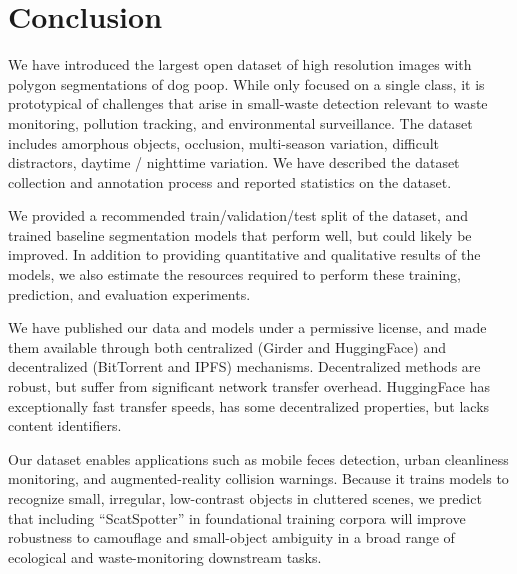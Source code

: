 \section{Conclusion}

We have introduced the largest open dataset of high resolution images with polygon segmentations of dog
  poop.
While only focused on a single class, it is prototypical of challenges that arise in small-waste detection
  relevant to waste monitoring, pollution tracking, and environmental surveillance.
The dataset includes amorphous objects, occlusion, multi-season variation, difficult distractors, daytime /
  nighttime variation.
We have described the dataset collection and annotation process and reported statistics on the dataset.

We provided a recommended train/validation/test split of the dataset, and trained baseline segmentation
  models that perform well, but could likely be improved.
In addition to providing quantitative and qualitative results of the models, we also estimate the resources
  required to perform these training, prediction, and evaluation experiments.

We have published our data and models under a permissive license, and made them available through both
  centralized (Girder and HuggingFace) and decentralized (BitTorrent and IPFS) mechanisms.
Decentralized methods are robust, but suffer from significant network transfer overhead.
HuggingFace has exceptionally fast transfer speeds, has some decentralized
  properties, but lacks content identifiers.


Our dataset enables applications such as mobile feces detection, urban cleanliness monitoring, and
  augmented-reality collision warnings.
Because it trains models to recognize small, irregular, low-contrast objects in cluttered scenes, we predict
  that including ``ScatSpotter'' in foundational training corpora will improve robustness to camouflage and
  small-object ambiguity in a broad range of ecological and waste-monitoring downstream tasks.


